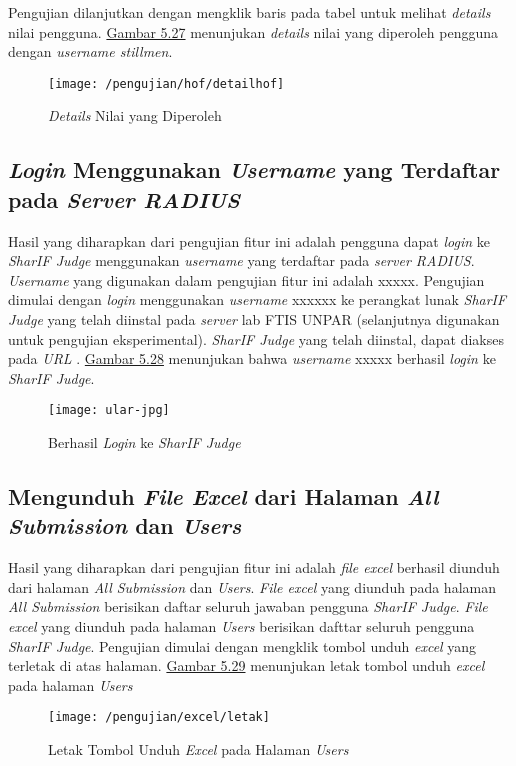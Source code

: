 	Pengujian dilanjutkan dengan mengklik baris pada tabel untuk melihat \textit{details} nilai pengguna. \hyperref[fig:dethof]{Gambar 5.27} menunjukan \textit{details} nilai yang diperoleh pengguna dengan \textit{username stillmen}.
	\begin{figure}[H]
		\centering  
		\texttt{[image: /pengujian/hof/detailhof]}  
		\caption[\textit{Details} Nilai yang Diperoleh]{\textit{Details} Nilai yang Diperoleh} 
		\label{fig:dethof} 
	\end{figure}

	\subsection{\textit{Login} Menggunakan \textit{Username} yang Terdaftar pada \textit{Server RADIUS}}
	Hasil yang diharapkan dari pengujian fitur ini adalah pengguna dapat \textit{login} ke \textit{SharIF Judge} menggunakan \textit{username} yang terdaftar pada \textit{server RADIUS}. \textit{Username} yang digunakan dalam pengujian fitur ini adalah xxxxx. Pengujian dimulai dengan \textit{login} menggunakan \textit{username} xxxxxx ke perangkat lunak \textit{SharIF Judge} yang telah diinstal pada \textit{server} lab FTIS UNPAR (selanjutnya digunakan untuk pengujian eksperimental). \textit{SharIF Judge} yang telah diinstal, dapat diakses pada \textit{URL} . \hyperref[fig:unduh]{Gambar 5.28} menunjukan bahwa \textit{username} xxxxx berhasil \textit{login} ke \textit{SharIF Judge}.
	\begin{figure}[H]
		\centering  
		\texttt{[image: ular-jpg]}  
		\caption[Berhasil \textit{Login} ke \textit{SharIF Judge}]{Berhasil \textit{Login} ke \textit{SharIF Judge}} 
		\label{fig:radius} 
	\end{figure}

	\subsection{Mengunduh \textit{File Excel} dari Halaman \textit{All Submission} dan \textit{Users}}
	Hasil yang diharapkan dari pengujian fitur ini adalah \textit{file excel} berhasil diunduh dari halaman \textit{All Submission} dan \textit{Users}. \textit{File excel} yang diunduh pada halaman \textit{All Submission} berisikan daftar seluruh jawaban pengguna \textit{SharIF Judge}. \textit{File excel} yang diunduh pada halaman \textit{Users} berisikan dafttar seluruh pengguna \textit{SharIF Judge}. Pengujian dimulai dengan mengklik tombol unduh \textit{excel} yang terletak di atas halaman. \hyperref[fig:unduh]{Gambar 5.29} menunjukan letak tombol unduh \textit{excel} pada halaman \textit{Users}
	\begin{figure}[H]
		\centering  
		\texttt{[image: /pengujian/excel/letak]}  
		\caption[Letak Tombol Unduh \textit{Excel} pada Halaman \textit{Users}]{Letak Tombol Unduh \textit{Excel} pada Halaman \textit{Users}} 
		\label{fig:unduh} 
	\end{figure}

